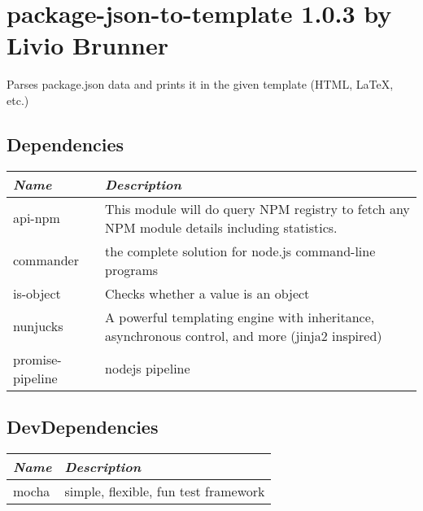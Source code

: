 \documentclass[12pt]{article}
\begin{document}
\section*{package-json-to-template 1.0.3 by Livio Brunner }

Parses package.json data and prints it in the given template (HTML, LaTeX, etc.)

\subsection*{Dependencies}

\begin{tabularx}{\textwidth}{p{} p{}}
    {\it Name} & {\it Description}\\
    \hline
    
    api-npm & This module will do query NPM registry to fetch any NPM module details including statistics.\\
    
    commander & the complete solution for node.js command-line programs\\
    
    is-object & Checks whether a value is an object\\
    
    nunjucks & A powerful templating engine with inheritance, asynchronous control, and more (jinja2 inspired)\\
    
    promise-pipeline & nodejs pipeline\\
     
\end{tabularx}

\subsection*{DevDependencies}

\begin{tabularx}{\textwidth}{p{} p{}}
    {\it Name} & {\it Description}\\
    \hline
    
    mocha & simple, flexible, fun test framework\\
     
\end{tabularx}


\newpage
\end{document}
